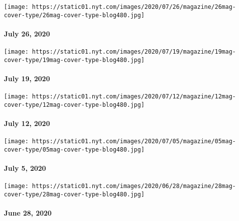 \texttt{[image: https://static01.nyt.com/images/2020/07/26/magazine/26mag-cover-type/26mag-cover-type-blog480.jpg]}

\hypertarget{july-26-2020}{%
\paragraph{July 26, 2020}\label{july-26-2020}}

\href{https://www.nytimes.com/issue/magazine/2020/07/17/the-71920-issue}{}

\texttt{[image: https://static01.nyt.com/images/2020/07/19/magazine/19mag-cover-type/19mag-cover-type-blog480.jpg]}

\hypertarget{july-19-2020}{%
\paragraph{July 19, 2020}\label{july-19-2020}}

\href{https://www.nytimes.com/issue/magazine/2020/07/10/the-71220-issue}{}

\texttt{[image: https://static01.nyt.com/images/2020/07/12/magazine/12mag-cover-type/12mag-cover-type-blog480.jpg]}

\hypertarget{july-12-2020}{%
\paragraph{July 12, 2020}\label{july-12-2020}}

\href{https://www.nytimes.com/issue/magazine/2020/07/02/the-7520-issue}{}

\texttt{[image: https://static01.nyt.com/images/2020/07/05/magazine/05mag-cover-type/05mag-cover-type-blog480.jpg]}

\hypertarget{july-5-2020}{%
\paragraph{July 5, 2020}\label{july-5-2020}}

\href{https://www.nytimes.com/issue/magazine/2020/06/25/the-62820-issue}{}

\texttt{[image: https://static01.nyt.com/images/2020/06/28/magazine/28mag-cover-type/28mag-cover-type-blog480.jpg]}

\hypertarget{june-28-2020}{%
\paragraph{June 28, 2020}\label{june-28-2020}}

